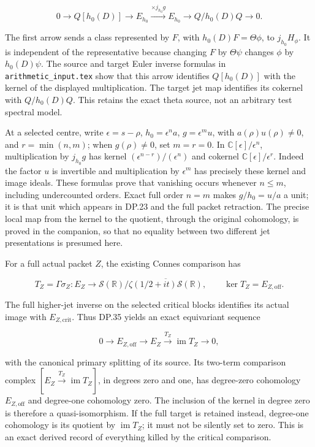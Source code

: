 \[
0\longrightarrow Q[h_0(D)]\longrightarrow E_{h_0}
 \xrightarrow{\times j_{h_0}g}E_{h_0}
 \longrightarrow Q/h_0(D)Q\longrightarrow0.
\tag{DP.34}
\]

The first arrow sends a class represented by \(F\), with \(h_0(D)F=\Theta\phi\), to \(j_{h_0}H_\phi\). It is independent of the representative because changing \(F\) by \(\Theta\psi\) changes \(\phi\) by \(h_0(D)\psi\). The source and target Euler inverse formulas in \nolinkurl{arithmetic_input.tex} show that this arrow identifies \(Q[h_0(D)]\) with the kernel of the displayed multiplication. The target jet map identifies its cokernel with \(Q/h_0(D)Q\). This retains the exact theta source, not an arbitrary test spectral model.

At a selected centre, write \(\epsilon=s-\rho\), \(h_0=\epsilon^n a\), \(g=\epsilon^m u\), with \(a(\rho)u(\rho)\ne0\), and \(r=\min(n,m)\); when \(g(\rho)\ne0\), set \(m=r=0\). In \(\mathbb C[\epsilon]/\epsilon^n\), multiplication by \(j_{h_0}g\) has kernel \((\epsilon^{n-r})/(\epsilon^n)\) and cokernel \(\mathbb C[\epsilon]/\epsilon^r\). Indeed the factor \(u\) is invertible and multiplication by \(\epsilon^m\) has precisely these kernel and image ideals. These formulas prove that vanishing occurs whenever \(n\le m\), including undercounted orders. Exact full order \(n=m\) makes \(g/h_0=u/a\) a unit; it is that unit which appears in DP.23 and the full packet retraction. The precise local map from the kernel to the quotient, through the original cohomology, is proved in the companion, so that no equality between two different jet presentations is presumed here.

For a full actual packet \(Z\), the existing Connes comparison has

\[
T_Z=\Gamma\sigma_Z:E_Z\longrightarrow
\mathcal S(\mathbb R)/\overline{\zeta(1/2+it)\mathcal S(\mathbb R)},
\qquad \ker T_Z=E_{Z,\mathrm{off}}.
\tag{DP.35}
\]

The full higher-jet inverse on the selected critical blocks identifies its actual image with \(E_{Z,\mathrm{crit}}\). Thus DP.35 yields an exact equivariant sequence

\[
0\longrightarrow E_{Z,\mathrm{off}}
\longrightarrow E_Z\xrightarrow{T_Z}\operatorname{im}T_Z
\longrightarrow0,
\tag{DP.36}
\]

with the canonical primary splitting of its source. Its two-term comparison complex \([E_Z\xrightarrow{T_Z}\operatorname{im}T_Z]\), in degrees zero and one, has degree-zero cohomology \(E_{Z,\mathrm{off}}\) and degree-one cohomology zero. The inclusion of the kernel in degree zero is therefore a quasi-isomorphism. If the full target is retained instead, degree-one cohomology is its quotient by \(\operatorname{im}T_Z\); it must not be silently set to zero. This is an exact derived record of everything killed by the critical comparison.

